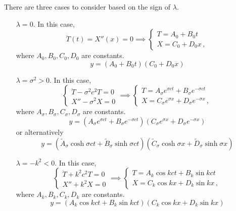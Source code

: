 \documentclass{article}
\theoremstyle{plain}\theoremheaderfont{\normalfont\itshape}\theorembodyfont{\rmfamily}\theoremseparator{.}\newtheorem*{rem}{Remark}\newtheorem*{ex}{Example}\newtheorem*{proof}{Proof}\newtheorem*{altp}{Alternative proof}
\theoremstyle{plain}\theoremheaderfont{\normalfont\bfseries}\theorembodyfont{\rmfamily}\theoremseparator{.}\newtheorem{thm}{Theorem}[section]\newtheorem{lem}[thm]{Lemma}\newtheorem{prop}[thm]{Proposition}\newtheorem*{cor}{Corollary}\newtheorem{defn}[thm]{Definition}\newtheorem{clm}[thm]{Claim}\newtheorem{clminproof}{Claim}
\theoremstyle{break}\theoremheaderfont{\normalfont\itshape}\theorembodyfont{\rmfamily}\theoremseparator{.\medskip}\newtheorem*{proofskip}{Proof}\newtheorem*{exs}{Examples}\newtheorem*{rems}{Remarks}
\theoremstyle{break}\theoremheaderfont{\normalfont\bfseries}\theorembodyfont{\rmfamily}\theoremseparator{.\medskip}\newtheorem{lemskip}[thm]{Lemma}\newtheorem{defnskip}[thm]{Definition}\newtheorem{propskip}[thm]{Proposition}\newtheorem{thmskip}[thm]{Theorem}
\numberwithin{equation}{section}
\begin{document}
	There are three cases to consider based on the sign of \(\lambda\).
	\begin{itemize}[leftmargin=32pt]
		\item[\(\lambda=0\).] In this case,
		\[\ddot{T}(t)=X''(x)=0 \implies \begin{cases}
			T=A_0+B_0 t\\
			X=C_0+D_0 x\,,
		\end{cases}\]
		where \(A_0,B_0,C_0,D_0\) are constants.
		\[y=(A_0+B_0t)(C_0+D_0x)\]
	\end{itemize}
	\begin{itemize}[leftmargin=32pt,itemindent=24pt]
		\item[\(\lambda=\sigma^2>0\).] In this case,
		\[\begin{cases}
			\ddot{T}-\sigma^2c^2T=0\\
			X''-\sigma^2X=0
		\end{cases}\implies\begin{cases}
		T=A_\sigma e^{\sigma ct}+B_\sigma e^{-\sigma ct}\\
		X=C_\sigma e^{\sigma x}+D_\sigma e^{-\sigma x}\,,
		\end{cases}\]
		where \(A_\sigma,B_\sigma,C_\sigma,D_\sigma\) are constants.
		\[y=(A_\sigma e^{\sigma ct}+B_\sigma e^{-\sigma ct})(C_\sigma e^{\sigma x}+D_\sigma e^{-\sigma x})\]
		or alternatively
		\[y=(\tilde{A}_\sigma\cosh\sigma ct+\tilde{B}_\sigma\sinh\sigma ct)(\tilde{C}_\sigma\cosh\sigma x+\tilde{D}_\sigma\sinh\sigma x)\]
	\end{itemize}
	\begin{itemize}[leftmargin=32pt,itemindent=31pt]
		\item[\(\lambda=-k^2<0\).] In this case,
		\[\begin{cases}
			\ddot{T}+k^2c^2T=0\\
			X''+k^2X=0
		\end{cases}\implies\begin{cases}
			T=A_k \cos kct+B_k \sin kct\\
			X=C_k \cos kx+D_k \sin kx\,,
		\end{cases}\]
		where \(A_k,B_k,C_k,D_k\) are constants.
		\[y=(A_k \cos kct+B_k \sin kct)(C_k \cos kx+D_k \sin kx)\]
	\end{itemize}
\end{document}
